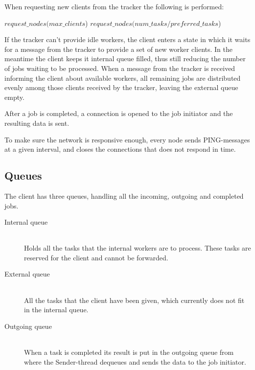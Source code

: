 When requesting new clients from the tracker
the following is performed: \\

\begin{samepage}
\begin{algorithmic}
\STATE {}
	\STATE $request\_nodes(max\_clients$)
\ELSE
	\STATE $request\_nodes(num\_tasks/preferred\_tasks$)
\ENDIF
\end{algorithmic}
\end{samepage}

If the tracker can't provide idle workers, the client enters a state in which it
waits for a message from the tracker to provide a set of new worker clients. In
the meantime the client keeps it internal queue filled, thus still reducing the
number of jobs waiting to be processed. When a message from the tracker is
received informing the client about available workers, all remaining jobs are
distributed evenly among those clients received by the tracker, leaving the
external queue empty.

After a job is completed, a connection is opened to the job initiator and the
resulting data is sent.

To make sure the network is responsive enough, every node sends PING-messages at a given interval, and closes the connections that does not respond in time.


\subsection{Queues}
The client has three queues, handling all the incoming, outgoing and completed jobs.
\begin{description}
	\item[Internal queue] \hfill \\
	Holds all the tasks that the internal workers are to process. These tasks
	are reserved for the client and cannot be forwarded.
	\item[External queue] \hfill \\
	All the tasks that the client have been given, which currently does not fit in the internal queue.
	\item[Outgoing queue] \hfill \\
	When a task is completed its result is put in the outgoing queue from where
	the Sender-thread dequeues and sends the data to the job initiator.
\end{description}

